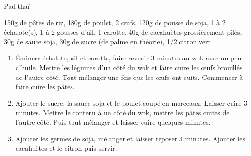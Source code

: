 \begin{recette}{Pad thaï}
	\begin{ingredients}
			150g de pâtes de riz\sep
			180g de poulet\sep
			2 œufs\sep
			120g de pousse de soja\sep
			1 à 2 échalote(s)\sep
			1 à 2 gousses d'ail\sep
			1 carotte\sep
			40g de cacahuètes grossièrement pilés\sep
			30g de sauce soja\sep
			30g de sucre (de palme en théorie)\sep
			1/2 citron vert
	\end{ingredients}
	
	\begin{enumerate}
		\item Émincer échalote, ail et carotte, faire revenir 3 minutes au wok avec un peu d'huile. Mettre les légumes d'un côté du wok et faire cuire les œufs brouillés de l'autre côté. Tout mélanger une fois que les œufs ont cuits. Commencer à faire cuire les pâtes.
		\item Ajouter le sucre, la sauce soja et le poulet coupé en morceaux. Laisser cuire 3 minutes. Mettre le contenu à un côté du wok, mettre les pâtes cuites de l'autre côté. Puis tout mélanger et laisser cuire quelques minutes.
		\item Ajouter les germes de soja, mélanger et laisser reposer 3 minutes. Ajouter les cacahuètes et le citron puis servir.
	\end{enumerate}
\end{recette}